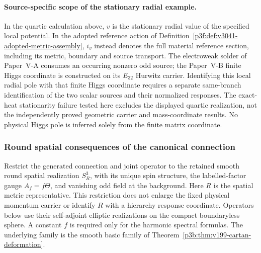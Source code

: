\documentclass[11pt,a4paper]{article}
\begin{document}
\paragraph{Source-specific scope of the stationary radial example.}
In the quartic calculation above, $v$ is the stationary radial value
of the specified local potential. In the adopted reference action of
Definition~\ref{p3f:def:v3041-adopted-metric-assembly}, $i_v$
instead denotes the full material reference section, including its
metric, boundary and source transport. The electroweak solder of
Paper~V-A consumes an occurring nonzero odd source; the Paper~V-B
finite Higgs coordinate is constructed on its $E_{32}$ Hurwitz carrier.
Identifying this local radial pole with that finite Higgs coordinate
requires a separate same-branch identification of the two scalar
sources and their normalized responses. The exact-heat stationarity
failure tested here excludes the displayed quartic realization, not
the independently proved geometric carrier and mass-coordinate results.
No physical Higgs pole is inferred solely from the finite matrix coordinate.



\subsubsection{Round spatial consequences of the canonical connection}
\label{p3f:sec:m8td-spatial-operators}

Restrict the generated connection and joint operator to the retained smooth
round spatial realization $S_R^3$, with its unique spin structure, the
labelled-factor gauge $A_f=f\Theta$, and vanishing odd field at the
background. Here $R$ is the spatial metric representative. This restriction
does not enlarge the fixed physical momentum carrier or identify $R$ with a
hierarchy response coordinate. Operators below use their self-adjoint
elliptic realizations on the compact boundaryless sphere. A constant $f$
is required only for the harmonic spectral formulas. The underlying family
is the smooth basic family of Theorem~\ref{p3b:thm:v199-cartan-deformation}.
\end{document}
